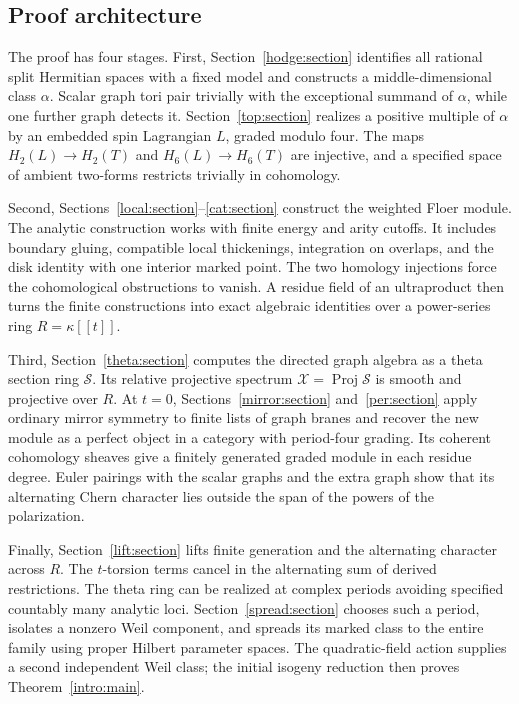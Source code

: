 \documentclass[11pt]{article}
\theoremstyle{definition}
\theoremstyle{remark}
\DeclareMathOperator{\Proj}{Proj}
\numberwithin{equation}{section}
\begin{document}
\subsection{Proof architecture}

The proof has four stages.  First, Section~\ref{hodge:section} identifies
all rational split Hermitian spaces with a fixed model and constructs
a middle-dimensional class $\alpha$.  Scalar graph tori pair trivially with
the exceptional summand of $\alpha$, while one further graph detects it.
Section~\ref{top:section} realizes a positive multiple
of $\alpha$ by an embedded spin Lagrangian $L$, graded modulo four.  The
maps $H_2(L)\to H_2(T)$ and $H_6(L)\to H_6(T)$ are injective, and a
specified space of ambient two-forms restricts trivially in cohomology.

Second, Sections~\ref{local:section}--\ref{cat:section} construct the
weighted Floer module.  The analytic construction works with finite
energy and arity cutoffs.  It includes boundary gluing, compatible local
thickenings, integration on overlaps, and the disk identity with one
interior marked point.  The two homology injections force the
cohomological obstructions to vanish.  A residue field of an ultraproduct
then turns the finite constructions into exact algebraic identities over
a power-series ring $R=\kappa[[t]]$.

Third, Section~\ref{theta:section} computes the directed graph algebra
as a theta section ring $\mathscr S$.  Its relative projective spectrum
$\mathscr X=\Proj\mathscr S$ is smooth and projective over $R$.
At $t=0$, Sections~\ref{mirror:section} and~\ref{per:section} apply
ordinary mirror symmetry to finite lists of graph branes and recover
the new module as a perfect object in a category with period-four
grading.  Its coherent cohomology sheaves give a finitely generated
graded module in each residue degree.  Euler pairings with the scalar
graphs and the extra graph show that its alternating Chern character
lies outside the span of the powers of the polarization.

Finally, Section~\ref{lift:section} lifts finite generation and the
alternating character across $R$.  The $t$-torsion terms cancel in the
alternating sum of derived restrictions.  The theta ring can be realized
at complex periods avoiding specified countably many analytic loci.
Section~\ref{spread:section} chooses such a period, isolates a nonzero
Weil component, and spreads its marked class to the entire family using
proper Hilbert parameter spaces.  The quadratic-field action supplies
a second independent Weil class; the initial isogeny reduction then
proves Theorem~\ref{intro:main}.
\end{document}
